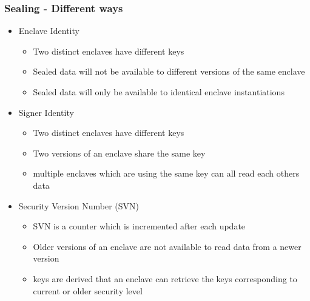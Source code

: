 \begin{frame}
    \frametitle{Sealing - Different ways}
    \begin{itemize}[<+->]
        \item Enclave Identity
        \begin{itemize}[<+->]
            \item Two distinct enclaves have different keys
            \item Sealed data will not be available to different versions of the same enclave
            \item Sealed data will only be available to identical enclave instantiations
        \end{itemize}
        \item Signer Identity
        \begin{itemize}[<+->]
            \item Two distinct enclaves have different keys
            \item Two versions of an enclave share the same key
            \item multiple enclaves which are using the same key can all read each others data
        \end{itemize}
        \item Security Version Number (SVN)
        \begin{itemize}[<+->]
            \item SVN is a counter which is incremented after each update
            \item Older versions of an enclave are not available to read data from a newer version
            \item keys are derived that an enclave can retrieve the keys corresponding to current or older security level
        \end{itemize}
    \end{itemize}
\end{frame}